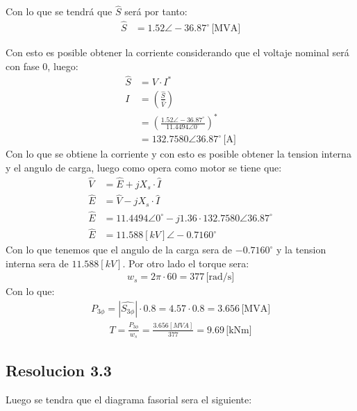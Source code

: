 \noindent Con lo que se tendrá que $\hat{S}$ será por tanto:
\begin{align}
    \hat{S} &= 1.52 \angle -36.87^{\circ} \, \text{[MVA]}
\end{align}

\noindent Con esto es posible obtener la corriente considerando que el voltaje nominal será con fase 0, luego:
\begin{align}
    \hat{S} &= V \cdot I^{*} \\
    I &= \left(\frac{\hat{S}}{\hat{V}}\right) \\
      &= \left(\frac{1.52 \angle -36.87^{\circ}}{11.4494 \angle 0^{\circ}}\right)^{*} \\
      &= 132.7580 \angle 36.87^{\circ} \, \text{[A]}
\end{align}
Con lo que se obtiene la corriente y con esto es posible obtener la tension interna y el angulo de carga, luego como opera como motor se tiene que:
\begin{align}
    \hat{V} &= \hat{E} + jX_{s} \cdot \hat{I} \\
    \hat{E} &= \hat{V} - jX_{s} \cdot \hat{I} \\
    \hat{E} &= 11.4494 \angle 0^{\circ} - j1.36 \cdot 132.7580 \angle 36.87^{\circ} \\
    \hat{E} &= 11.588[kV] \angle -0.7160^{\circ}
\end{align}
Con lo que tenemos que el angulo de la carga sera de $-0.7160^{\circ}$ y la tension interna sera de $11.588[kV]$. Por otro lado el torque sera:
\begin{align}
    w_{s} = 2\pi \cdot 60 = 377 \, \text{[rad/s]}
\end{align}
Con lo que:
\begin{align}
    P_{3\phi} = |\hat{S_{3\phi}}| \cdot 0.8 = 4.57 \cdot 0.8 = 3.656 \, \text{[MVA]} 
\end{align}
\begin{align}
    T = \frac{P_{3\phi}}{w_{s}}=  \frac{3.656[MVA] }{377}= 9.69 \, \text{[kNm]}
\end{align}
\subsection*{Resolucion 3.3}
Luego se tendra que el diagrama fasorial sera el siguiente:

